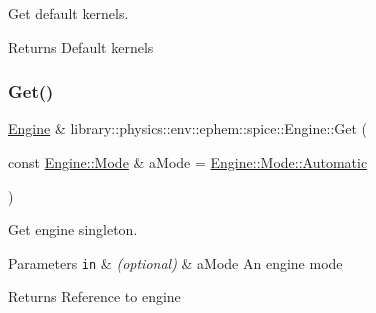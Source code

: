 Get default kernels. 

\begin{DoxyReturn}{Returns}
Default kernels 
\end{DoxyReturn}
\mbox{\label{classlibrary_1_1physics_1_1env_1_1ephem_1_1spice_1_1_engine_ae5def9d4300f0673b2bc73f0703afeb1}} 
\subsubsection{\texorpdfstring{Get()}{Get()}}
{\footnotesize\ttfamily \hyperlink{classlibrary_1_1physics_1_1env_1_1ephem_1_1spice_1_1_engine}{Engine} \& library\+::physics\+::env\+::ephem\+::spice\+::\+Engine\+::\+Get (\begin{DoxyParamCaption}\item[{const \hyperlink{classlibrary_1_1physics_1_1env_1_1ephem_1_1spice_1_1_engine_a2d185a63bce354bff9ad38810410eab4}{Engine\+::\+Mode} \&}]{a\+Mode = {\ttfamily \hyperlink{classlibrary_1_1physics_1_1env_1_1ephem_1_1spice_1_1_engine_a2d185a63bce354bff9ad38810410eab4a086247a9b57fde6eefee2a0c4752242d}{Engine\+::\+Mode\+::\+Automatic}} }\end{DoxyParamCaption})\hspace{0.3cm}{\ttfamily [static]}}



Get engine singleton. 


\begin{DoxyParams}[1]{Parameters}
\mbox{\tt in}  & {\em (optional)} & a\+Mode An engine mode \\
\hline
\end{DoxyParams}
\begin{DoxyReturn}{Returns}
Reference to engine 
\end{DoxyReturn}
\mbox{\label{classlibrary_1_1physics_1_1env_1_1ephem_1_1spice_1_1_engine_af5bdad7a3783f772b726ac3f0cd09957}} 
